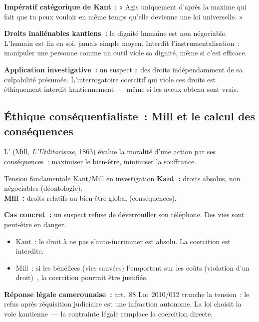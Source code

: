 \begin{boxdef}
\textbf{Impératif catégorique de Kant}~: « Agis uniquement d'après
la maxime qui fait que tu peux vouloir en même temps qu'elle devienne
une loi universelle. »

\textbf{Droits inaliénables kantiens~:} la dignité humaine est non
négociable. L'humain est fin en soi, jamais simple moyen. Interdit
l'instrumentalisation~: manipuler une personne comme un outil viole
sa dignité, même si c'est efficace.

\textbf{Application investigative~:} un suspect a des droits indépendamment
de sa culpabilité présumée. L'interrogatoire coercitif qui viole ces
droits est éthiquement interdit kantiennement~--- même si les aveux
obtenu sont vrais.
\end{boxdef}

\subsection{Éthique conséquentialiste~: Mill et le calcul des conséquences}

L' (Mill,
\textit{L'Utilitarisme}, 1863) évalue la moralité d'une action par
ses conséquences~: maximiser le bien-être, minimiser la souffrance.

\begin{boiteRemarque}{Tension fondamentale Kant/Mill en investigation}
\textbf{Kant~:} droits absolus, non négociables (déontologie).\\
\textbf{Mill~:} droits relatifs au bien-être global (conséquences).

\textbf{Cas concret~:} un suspect refuse de déverrouiller son téléphone.
Des vies sont peut-être en danger.
\begin{itemize}
    \item Kant~: le droit à ne pas s'auto-incriminer est absolu.
          La coercition est interdite.
    \item Mill~: si les bénéfices (vies sauvées) l'emportent sur
          les coûts (violation d'un droit)~, la coercition pourrait
          être justifiée.
\end{itemize}
\textbf{Réponse légale camerounaise~:} art.~88 Loi~2010/012 tranche
la tension~: le refus après réquisition judiciaire est une infraction
autonome. La loi choisit la voie kantienne~--- la contrainte légale
remplace la coercition directe.
\end{boiteRemarque}


